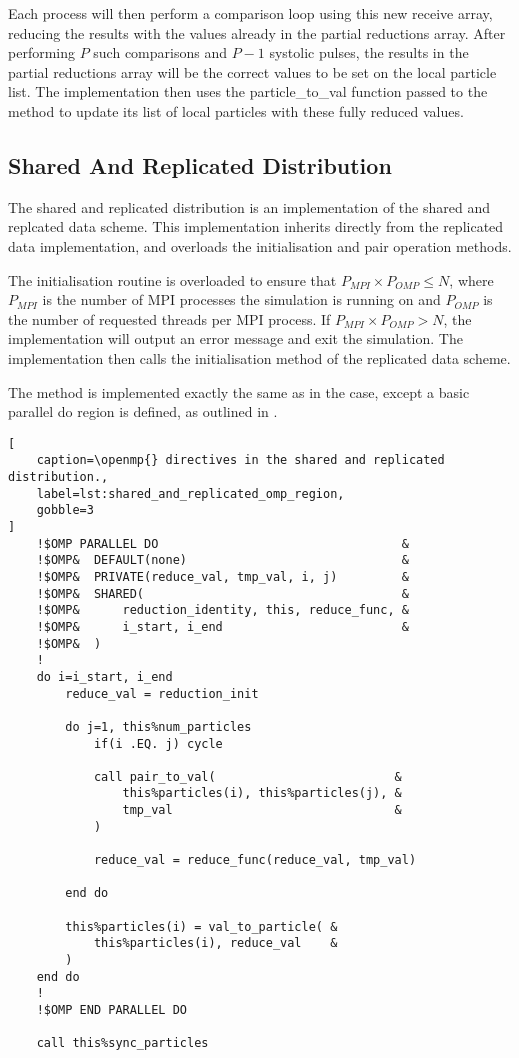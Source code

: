 Each process will then perform a comparison loop using this new receive
array, reducing the results with the values already in the partial
reductions array.
%
After performing $P$ such comparisons and $P-1$ systolic pulses,
the results in the partial reductions array will be the correct
values to be set on the local particle list.
%
The implementation then uses the particle\_to\_val function
passed to the method to update
its list of local particles with these fully reduced values.


\subsection{Shared And Replicated Distribution}

%
The shared and replicated distribution is an implementation of the
shared and replcated data scheme.
%
This implementation inherits directly from the replicated data
implementation, and overloads the initialisation and pair operation
methods.

The initialisation routine is overloaded to ensure that
$P_{MPI}\times{}P_{OMP} \le{} N$, where $P_{MPI}$ is the number of MPI
processes the simulation is running on and $P_{OMP}$ is the
number of requested \openmp{} threads per MPI process.
%
If $P_{MPI}\times{}P_{OMP} > N$, the implementation will output an error message
and exit the simulation.
%
The implementation then calls the initialisation method of the
replicated data scheme.

The \pairoperation{} method is implemented exactly the same
as in the \replicateddata{} case, except a basic \openmp{}
parallel do region is defined, as outlined in
.

\begin{lstlisting}[
    caption=\openmp{} directives in the shared and replicated distribution.,
    label=lst:shared_and_replicated_omp_region,
    gobble=3
]
    !$OMP PARALLEL DO                                  &
    !$OMP&  DEFAULT(none)                              &
    !$OMP&  PRIVATE(reduce_val, tmp_val, i, j)         &
    !$OMP&  SHARED(                                    &
    !$OMP&      reduction_identity, this, reduce_func, &
    !$OMP&      i_start, i_end                         &
    !$OMP&  )
    !
    do i=i_start, i_end
        reduce_val = reduction_init

        do j=1, this%num_particles
            if(i .EQ. j) cycle

            call pair_to_val(                         &
                this%particles(i), this%particles(j), &
                tmp_val                               &
            )

            reduce_val = reduce_func(reduce_val, tmp_val)

        end do

        this%particles(i) = val_to_particle( &
            this%particles(i), reduce_val    &
        )
    end do
    !
    !$OMP END PARALLEL DO

    call this%sync_particles
\end{lstlisting}


